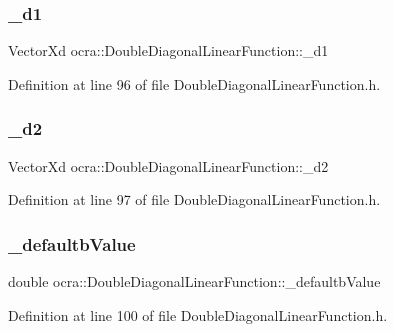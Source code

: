 \subsubsection{\texorpdfstring{\+\_\+d1}{\_d1}}
{\footnotesize\ttfamily Vector\+Xd ocra\+::\+Double\+Diagonal\+Linear\+Function\+::\+\_\+d1\hspace{0.3cm}{\ttfamily [protected]}}



Definition at line 96 of file Double\+Diagonal\+Linear\+Function.\+h.

\hypertarget{classocra_1_1DoubleDiagonalLinearFunction_a043b9a5dba8b0d42b00deed8898c1843}{}\label{classocra_1_1DoubleDiagonalLinearFunction_a043b9a5dba8b0d42b00deed8898c1843} 
\subsubsection{\texorpdfstring{\+\_\+d2}{\_d2}}
{\footnotesize\ttfamily Vector\+Xd ocra\+::\+Double\+Diagonal\+Linear\+Function\+::\+\_\+d2\hspace{0.3cm}{\ttfamily [protected]}}



Definition at line 97 of file Double\+Diagonal\+Linear\+Function.\+h.

\hypertarget{classocra_1_1DoubleDiagonalLinearFunction_a24ebbdd1093941e346c6931f23d3193f}{}\label{classocra_1_1DoubleDiagonalLinearFunction_a24ebbdd1093941e346c6931f23d3193f} 
\subsubsection{\texorpdfstring{\+\_\+defaultb\+Value}{\_defaultbValue}}
{\footnotesize\ttfamily double ocra\+::\+Double\+Diagonal\+Linear\+Function\+::\+\_\+defaultb\+Value\hspace{0.3cm}{\ttfamily [protected]}}



Definition at line 100 of file Double\+Diagonal\+Linear\+Function.\+h.

